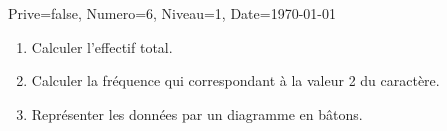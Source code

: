 \documentclass[a4paper,12pt]{article}
\begin{document}
\begin{Maquette}[DM]{Prive=false, Numero=6, Niveau=1, Date=\today}
\begin{exercice}
\begin{enumerate}
\item Calculer l'effectif total.
\item Calculer la fréquence qui correspondant à la valeur 2 du caractère.
\item Représenter les données par un diagramme en bâtons.
\end{enumerate}
\end{exercice}
\end{Maquette}
\end{document}
